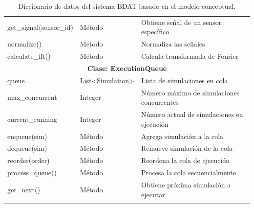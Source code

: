 \begin{longtable}{|p{3cm}|p{2cm}|p{8cm}|}
get\_signal(sensor\_id) & Método & Obtiene señal de un sensor específico \\
normalize() & Método & Normaliza las señales \\
calculate\_fft() & Método & Calcula transformada de Fourier \\
\hline
\multicolumn{3}{|c|}{\textbf{Clase: ExecutionQueue}} \\
\hline
queue & List<Simulation> & Lista de simulaciones en cola \\
max\_concurrent & Integer & Número máximo de simulaciones concurrentes \\
current\_running & Integer & Número actual de simulaciones en ejecución \\
enqueue(sim) & Método & Agrega simulación a la cola \\
dequeue(sim) & Método & Remueve simulación de la cola \\
reorder(order) & Método & Reordena la cola de ejecución \\
process\_queue() & Método & Procesa la cola secuencialmente \\
get\_next() & Método & Obtiene próxima simulación a ejecutar \\
\hline
\caption{Diccionario de datos del sistema BDAT basado en el modelo conceptual.}
\label{tab:diccionario_datos}
\end{longtable}
